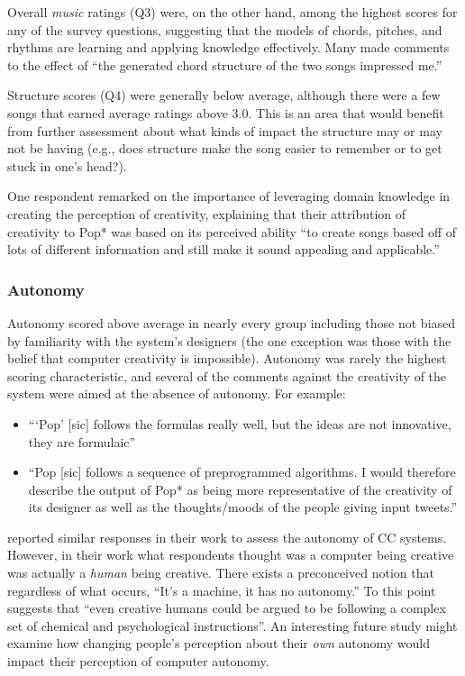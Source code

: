 \documentclass[phd,electronic,oneside,twosidetoc,letterpaper,chaptercenter,parttop,lof,lot]{byumsphd}
\begin{document}
Overall \textit{music} ratings (Q3) were, on the other hand, among the highest scores for any of the survey questions, suggesting that the models of chords, pitches, and rhythms are learning and applying knowledge effectively. Many made comments to the effect of ``the generated chord structure of the two songs impressed me.''

Structure scores (Q4) were generally below average, although there were a few songs that earned average ratings above 3.0. This is an area that would benefit from further assessment about what kinds of impact the structure may or may not be having (e.g., does structure make the song easier to remember or to get stuck in one's head?).

One respondent remarked on the importance of leveraging domain knowledge in creating the perception of creativity, explaining that their attribution of creativity to Pop* was based on its perceived ability ``to create songs based off of lots of different information and still make it sound appealing and applicable.''

\subsubsection{Autonomy}

Autonomy scored above average in nearly every group including those not biased by familiarity with the system's designers (the one exception was those with the belief that computer creativity is impossible). Autonomy was rarely the highest scoring characteristic, and several of the comments against the creativity of the system were aimed at the absence of autonomy. For example:

\begin{itemize}
\item ```Pop' [sic] follows the formulas really well, but the ideas are not innovative, they are formulaic''
\item ``Pop [sic] follows a sequence of preprogrammed algorithms.  I would therefore describe the output of Pop* as being more representative of the creativity of its designer as well as the thoughts/moods of the people giving input tweets.''
\end{itemize}

\citeauthor{mumford2015man} \cite{mumford2015man} reported similar responses in their work to assess the autonomy of CC systems. However, in their work what respondents thought was a computer being creative was actually a \textit{human} being creative. There exists a preconceived notion that regardless of what occurs, ``It's a machine, it has no autonomy.'' To this point \citeauthor{mumford2015man} \cite{mumford2015man} suggests that ``even creative humans could be argued to be following a complex set of chemical and psychological instructions''. An interesting future study might examine how changing people's perception about their \textit{own} autonomy would impact their perception of computer autonomy.
\end{document}
